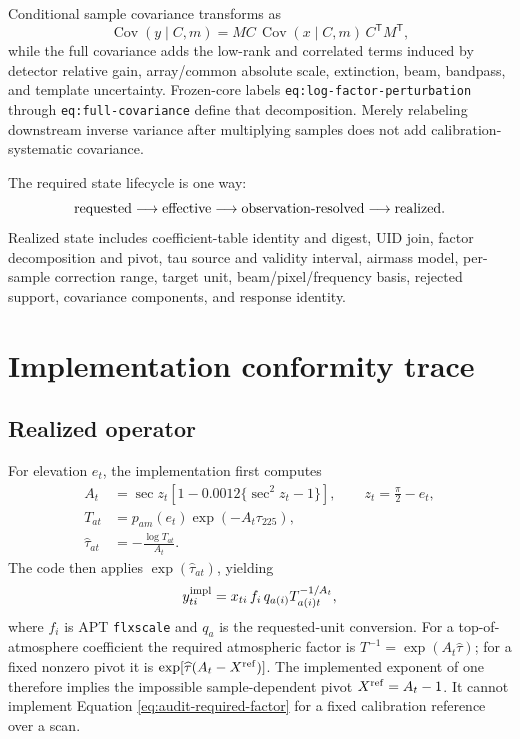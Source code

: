 \documentclass[11pt]{article}
\newcommand{\Cov}{\operatorname{Cov}}
\newcommand{\code}[1]{\nolinkurl{#1}}
\begin{document}
Conditional sample covariance transforms as
\begin{equation}
 \Cov(y\mid C,m)=M C\,\Cov(x\mid C,m)\,C^{\mathsf T}M^{\mathsf T},
 \label{eq:audit-conditional-covariance}
\end{equation}
while the full covariance adds the low-rank and correlated terms induced by
detector relative gain, array/common absolute scale, extinction, beam,
bandpass, and template uncertainty.  Frozen-core labels
\code{eq:log-factor-perturbation} through \code{eq:full-covariance} define
that decomposition.  Merely relabeling downstream inverse variance
after multiplying samples does not add calibration-systematic covariance.

The required state lifecycle is one way:
\begin{equation}
 \hbox{requested}\longrightarrow\hbox{effective}
 \longrightarrow\hbox{observation-resolved}\longrightarrow\hbox{realized}.
 \label{eq:audit-state-lifecycle}
\end{equation}
Realized state includes coefficient-table identity and digest, UID join,
factor decomposition and pivot, tau source and validity interval, airmass
model, per-sample correction range, target unit, beam/pixel/frequency basis,
rejected support, covariance components, and response identity.

\section{Implementation conformity trace}

\subsection{Realized operator}

For elevation \(e_t\), the implementation first computes
\begin{align}
 A_t &= \sec z_t\left[1-0.0012\{\sec^2 z_t-1\}\right],
 \qquad z_t=\frac{\pi}{2}-e_t,\\
 T_{at} &= p_{am}(e_t)\exp(-A_t\tau_{225}),\\
 \widehat\tau_{at} &= -\frac{\log T_{at}}{A_t}.
 \label{eq:audit-code-tau}
\end{align}
The code then applies \(\exp(\widehat\tau_{at})\), yielding
\begin{equation}
 y^{\rm impl}_{ti}=x_{ti}\,f_i\,q_{a(i)}
 T_{a(i)t}^{-1/A_t},
 \label{eq:audit-code-signal}
\end{equation}
where \(f_i\) is APT \code{flxscale} and \(q_a\) is the requested-unit
conversion.  For a top-of-atmosphere coefficient the required atmospheric
factor is \(T^{-1}=\exp(A_t\widehat\tau)\); for a fixed nonzero pivot it is
\(\exp[\widehat\tau(A_t-X^{\rm ref})]\).  The implemented exponent of one
therefore implies the impossible sample-dependent pivot
\(X^{\rm ref}=A_t-1\).  It cannot implement Equation
\eqref{eq:audit-required-factor} for a fixed calibration reference over a scan.
\end{document}
